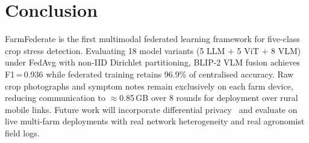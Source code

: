 \documentclass[conference]{IEEEtran}
\begin{document}
\section{Conclusion}

FarmFederate is the first multimodal federated learning framework for
five-class crop stress detection. Evaluating 18 model variants
(5 LLM $+$ 5 ViT $+$ 8 VLM) under FedAvg with non-IID Dirichlet
partitioning, BLIP-2 VLM fusion achieves F1\,=\,0.936 while federated
training retains 96.9\% of centralised accuracy. Raw crop photographs and
symptom notes remain exclusively on each farm device, reducing
communication to ${\approx}$0.85\,GB over 8 rounds for deployment over
rural mobile links. Future work will incorporate differential
privacy~\cite{Abadi2016} and evaluate on live multi-farm deployments with
real network heterogeneity and real agronomist field logs.
\end{document}
